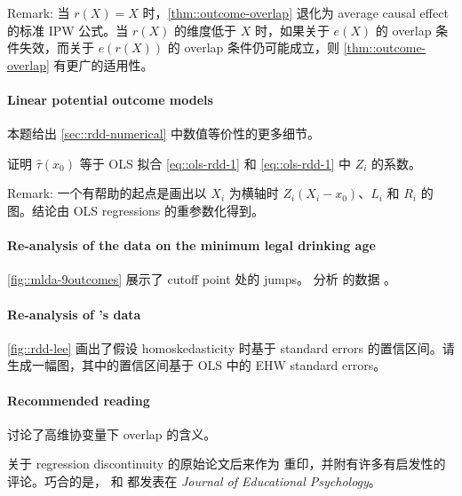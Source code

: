 Remark: 当 $r(X) = X$ 时，\cref{thm::outcome-overlap} 退化为 average causal effect 的标准 IPW 公式。当 $r(X)$ 的维度低于 $X$ 时，如果关于 $e(X)$ 的 overlap 条件失效，而关于 $e(r(X)) $ 的 overlap 条件仍可能成立，则 \cref{thm::outcome-overlap} 有更广的适用性。




 \paragraph{Linear potential outcome models}\label{hw::rdd-ols-fits}
 
 
 本题给出 \cref{sec::rdd-numerical} 中数值等价性的更多细节。
 
 证明 $\hat\tau(x_0) $ 等于 OLS 拟合 \cref{eq::ols-rdd-1} 和 \cref{eq::ols-rdd-1} 中 $Z_i$ 的系数。
 


Remark: 一个有帮助的起点是画出以 $X_i$ 为横轴时 $Z_i(X_i - x_0)$、$L_i$ 和 $R_i$ 的图。结论由 OLS regressions 的重参数化得到。



\paragraph{Re-analysis of the data on the minimum legal drinking age}\label{hw::MLDA}


\cref{fig::mlda-9outcomes} 展示了 cutoff point 处的 jumps。
分析 \citet{carpenter2009effect} 的数据 。

\paragraph{Re-analysis of \citet{lee2008randomized}'s data}\label{hw::lee2008-robust}

\cref{fig::rdd-lee} 画出了假设 homoskedasticity 时基于 standard errors 的置信区间。请生成一幅图，其中的置信区间基于 OLS 中的 EHW standard errors。




\paragraph{Recommended reading}

\citet{d2017overlap} 讨论了高维协变量下 overlap 的含义。

\citet{thistlethwaite1960regression} 关于 regression discontinuity 的原始论文后来作为 \citet{thistlewaiteregression2016obs} 重印，并附有许多有启发性的评论。巧合的是，\citet{thistlethwaite1960regression} 和 \citet{Rubin:1974} 都发表在 {\it Journal of Educational Psychology}。
